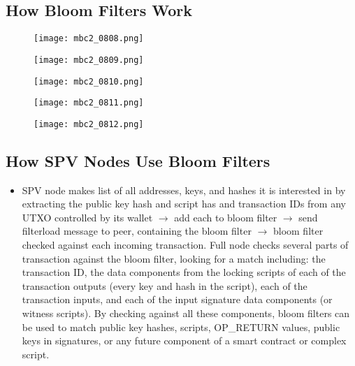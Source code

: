 \documentclass[english, 11pt]{article}
\begin{document}
\subsection{How Bloom Filters Work}

\begin{figure}[h]
\centering
\begin{minipage}{.3\textwidth}
  \centering
  \texttt{[image: mbc2\_0808.png]}
\end{minipage}%
\begin{minipage}{.3\textwidth}
  \centering
  \texttt{[image: mbc2\_0809.png]}
\end{minipage}
\begin{minipage}{.3\textwidth}
  \centering
  \texttt{[image: mbc2\_0810.png]}
\end{minipage}
\begin{minipage}{.3\textwidth}
  \centering
  \texttt{[image: mbc2\_0811.png]}
\end{minipage}
\begin{minipage}{.3\textwidth}
  \centering
  \texttt{[image: mbc2\_0812.png]}
\end{minipage}
\end{figure}

\subsection{How SPV Nodes Use Bloom Filters}
\begin{itemize}
    \item SPV node makes list of all addresses, keys, and hashes it is interested in by extracting the public key hash and script has and transaction IDs from any UTXO controlled by its wallet $\rightarrow$ add each to bloom filter $\rightarrow$ send filterload message to peer, containing the bloom filter $\rightarrow$ bloom filter checked against each incoming transaction. Full node checks several parts of transaction against the bloom filter, looking for a match including: the transaction ID, the data components from the locking scripts of each of the transaction outputs (every key and hash in the script), each of the transaction inputs, and each of the input signature data components (or witness scripts). By checking against all these components, bloom filters can be used to match public key hashes, scripts, OP_RETURN values, public keys in signatures, or any future component of a smart contract or complex script.
\end{itemize}
\end{document}
